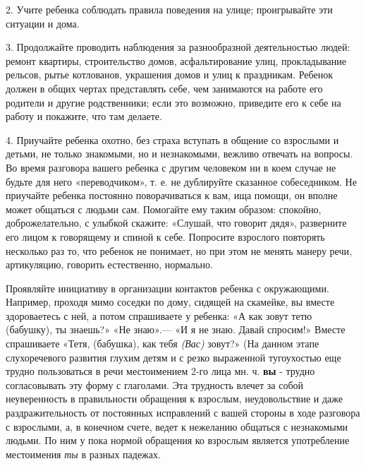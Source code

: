 \documentclass[a5paper]{book}
\renewcommand{\emph}[1]{\textit{#1}}
\begin{document}
2. Учите ребенка соблюдать правила поведения на улице; проигрывайте эти
ситуации и дома.

3. Продолжайте проводить наблюдения за разнообразной деятельностью
людей: ремонт квартиры, строительство домов, асфальтирование улиц,
прокладывание рельсов, рытье котлованов, украшения домов и улиц к
праздникам. Ребенок должен в общих чертах представлять себе, чем
занимаются на работе его родители и другие родственники; если это
возможно, приведите его к себе на работу и покажите, что там делаете.

4. Приучайте ребенка охотно, без страха вступать в общение со взрослыми
и детьми, не только знакомыми, но и незнакомыми, вежливо отвечать на
вопросы. Во время разговора вашего ребенка с другим человеком ни в коем
случае не будьте для него «переводчиком», т. е. не дублируйте сказанное
собеседником. Не приучайте ребенка постоянно поворачиваться к вам, ища
помощи, он вполне может общаться с людьми сам. Помогайте ему таким
образом: спокойно, доброжелательно, с улыбкой скажите: «Слушай, что
говорит дядя», разверните его лицом к говорящему и спиной к себе.
Попросите взрослого повторять несколько раз то, что ребенок не понимает,
но при этом не менять манеру речи, артикуляцию, говорить естественно,
нормально.

Проявляйте инициативу в организации контактов ребенка с окружающими.
Например, проходя мимо соседки по дому, сидящей на скамейке, вы вместе
здороваетесь с ней, а потом спрашиваете у ребенка: «А как зовут тетю
(бабушку), ты знаешь?» «Не знаю».--- «И я не знаю. Давай спросим!»
Вместе спрашиваете «Тетя, (бабушка), как тебя \emph{(Вас)} зовут?» (На
данном этапе слухоречевого развития глухим детям и с резко выраженной
тугоухостью еще трудно пользоваться в речи местоимением 2-го лица мн. ч.
\textbf{вы} - трудно согласовывать эту форму с глаголами. Эта трудность
влечет за собой неуверенность в правильности обращения к взрослым,
неудовольствие и даже раздражительность от постоянных исправлений с
вашей стороны в ходе разговора с взрослыми, а, в конечном счете, ведет к
нежеланию общаться с незнакомыми людьми. По ним у пока нормой обращения
ко взрослым является употребление местоимения \emph{ты} в разных
падежах.
\end{document}
